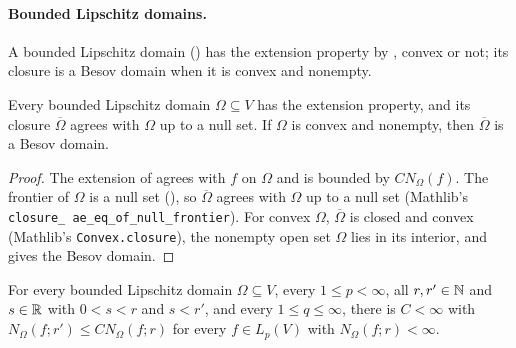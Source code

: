\paragraph{Bounded Lipschitz domains.}
A bounded Lipschitz domain () has the extension property by
, convex or not; its closure is a Besov domain when it is
convex and nonempty.

\begin{theorem}
\label{thm:bounded-lipschitz-besov-domain}
\leanok
{}
Every bounded Lipschitz domain $\Omega \subseteq V$ has the extension property, and its closure
$\overline{\Omega}$ agrees with $\Omega$ up to a null set. If $\Omega$ is convex and nonempty, then
$\overline{\Omega}$ is a Besov domain.
\end{theorem}

\begin{proof}
\leanok
The extension of  agrees with $f$ on $\Omega$ and is bounded by
$C N_\Omega(f)$. The frontier of $\Omega$ is a null set (), so
$\overline{\Omega}$ agrees with $\Omega$ up to a null set (Mathlib's \texttt{closure\_\allowbreak
ae\_\allowbreak eq\_\allowbreak of\_\allowbreak null\_\allowbreak frontier}). For convex $\Omega$,
$\overline{\Omega}$ is closed and convex (Mathlib's \texttt{Convex.\allowbreak closure}), the
nonempty open set $\Omega$ lies in its interior, and  gives the
Besov domain.
\end{proof}

\begin{corollary}
\label{cor:bounded-lipschitz-order}
\leanok
{}
For every bounded Lipschitz domain $\Omega \subseteq V$, every $1 \leq p < \infty$, all
$r, r' \in \mathbb{N}$ and $s \in \mathbb{R}$ with $0 < s < r$ and $s < r'$, and every $1 \leq q \leq \infty$,
there is $C < \infty$ with $N_\Omega(f; r') \leq C N_\Omega(f; r)$ for every $f \in L_p(V)$ with
$N_\Omega(f; r) < \infty$.
\end{corollary}

